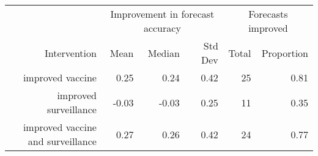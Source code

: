 
\begin{tabular*}{1.0\textwidth}{rrrrrr}
\toprule
             & \multicolumn{3}{c}{Improvement in forecast accuracy} & \multicolumn{2}{c}{Forecasts improved} \\
Intervention & Mean & Median & Std Dev & Total & Proportion \\
\midrule

improved vaccine & 0.25 & 0.24 & 0.42 & 25 & 0.81 \\
improved surveillance & -0.03 & -0.03 & 0.25 & 11 & 0.35 \\
improved vaccine and surveillance & 0.27 & 0.26 & 0.42 & 24 & 0.77 \\

\bottomrule
\end{tabular*}

